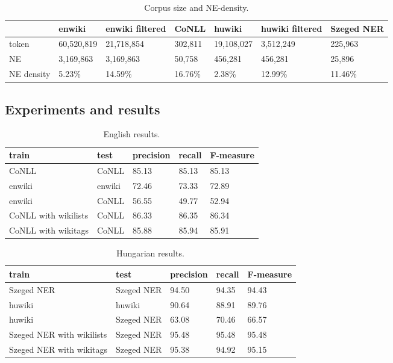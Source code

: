 \documentclass[11pt]{article}
\begin{document}
\begin{table*}[ht]
\begin{center}
\begin{tabular}{lllllll}
\hline  & \bf enwiki & \bf enwiki filtered & \bf CoNLL & \bf huwiki & \bf huwiki filtered  & \bf Szeged NER \\ \hline
token & 60,520,819 & 21,718,854 & 302,811 &  19,108,027 & 3,512,249  & 225,963\\
NE & 3,169,863 & 3,169,863 & 50,758 & 456,281 & 456,281  & 25,896\\
NE density & 5.23\% & 14.59\% & 16.76\% & 2.38\% & 12.99\%  & 11.46\%\\
\hline
\end{tabular}
\end{center}
\caption{\label{size} Corpus size and NE-density.}
\end{table*}

\subsection{Experiments and results}

\begin{table*}[ht]
\begin{center}
\begin{tabular}{lllll}
\hline \bf train & \bf test & \bf precision & \bf recall & \bf F-measure \\ \hline
CoNLL & CoNLL & 85.13 & 85.13 & 85.13 \\
enwiki & enwiki & 72.46 & 73.33 &  72.89 \\
enwiki & CoNLL & 56.55 & 49.77 & 52.94 \\
CoNLL with wikilists & CoNLL & 86.33 & 86.35 & 86.34 \\
CoNLL with wikitags & CoNLL & 85.88 & 85.94 & 85.91 \\
\hline
\end{tabular}
\end{center}
\caption{\label{enresults} English results.}
\end{table*}

\begin{table*}[ht]
\begin{center}
\begin{tabular}{lllll}
\hline \bf train & \bf test & \bf precision & \bf recall & \bf F-measure \\ \hline
Szeged NER & Szeged NER & 94.50 & 94.35 & 94.43 \\
huwiki & huwiki & 90.64 & 88.91 &  89.76 \\
huwiki & Szeged NER & 63.08 & 70.46 & 66.57 \\
Szeged NER with wikilists & Szeged NER & 95.48 & 95.48 & 95.48 \\
Szeged NER with wikitags & Szeged NER & 95.38 & 94.92 & 95.15 \\
\hline
\end{tabular}
\end{center}
\caption{\label{huresults} Hungarian results.}
\end{table*}
\end{document}
